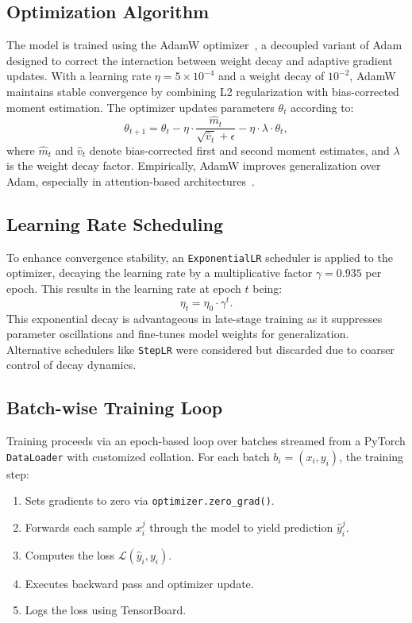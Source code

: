 \subsection{Optimization Algorithm}
The model is trained using the AdamW optimizer~\cite{loshchilov2018decoupled}, a decoupled variant of Adam designed to correct the interaction between weight decay and adaptive gradient updates. With a learning rate $\eta = 5\times 10^{-4}$ and a weight decay of $10^{-2}$, AdamW maintains stable convergence by combining L2 regularization with bias-corrected moment estimation. The optimizer updates parameters $\theta_t$ according to:
\begin{equation}
\theta_{t+1} = \theta_t - \eta \cdot \frac{\hat{m}_t}{\sqrt{\hat{v}_t} + \epsilon} - \eta \cdot \lambda \cdot \theta_t,
\end{equation}
where $\hat{m}_t$ and $\hat{v}_t$ denote bias-corrected first and second moment estimates, and $\lambda$ is the weight decay factor. Empirically, AdamW improves generalization over Adam, especially in attention-based architectures~\cite{liu2019variance}.

\subsection{Learning Rate Scheduling}
To enhance convergence stability, an \texttt{ExponentialLR} scheduler is applied to the optimizer, decaying the learning rate by a multiplicative factor $\gamma = 0.935$ per epoch. This results in the learning rate at epoch $t$ being:
\begin{equation}
\eta_t = \eta_0 \cdot \gamma^t.
\end{equation}
This exponential decay is advantageous in late-stage training as it suppresses parameter oscillations and fine-tunes model weights for generalization. Alternative schedulers like \texttt{StepLR} were considered but discarded due to coarser control of decay dynamics.

\subsection{Batch-wise Training Loop}
Training proceeds via an epoch-based loop over batches streamed from a PyTorch \texttt{DataLoader} with customized collation. For each batch $b_i = (x_i, y_i)$, the training step:
\begin{enumerate}
  \item Sets gradients to zero via \texttt{optimizer.zero\_grad()}.
  \item Forwards each sample $x_i^j$ through the model to yield prediction $\hat{y}_i^j$.
  \item Computes the loss $\mathcal{L}(\hat{y}_i, y_i)$.
  \item Executes backward pass and optimizer update.
  \item Logs the loss using TensorBoard.
\end{enumerate}

